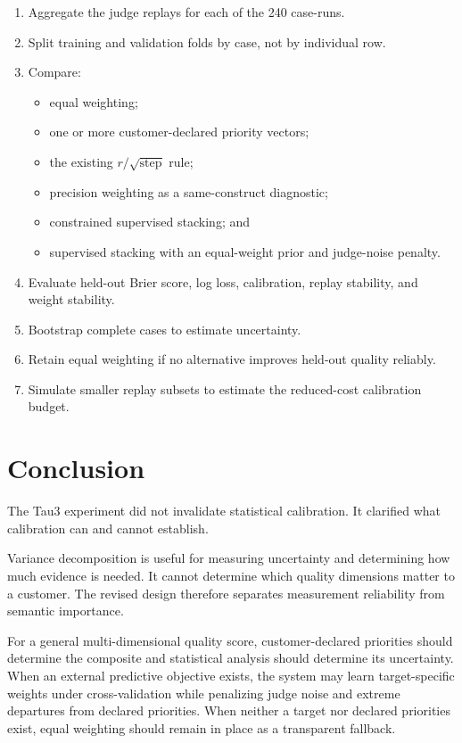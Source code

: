 \documentclass[11pt]{article}
\begin{document}
\begin{enumerate}
    \item Aggregate the judge replays for each of the 240 case-runs.
    \item Split training and validation folds by case, not by individual row.
    \item Compare:
    \begin{itemize}
        \item equal weighting;
        \item one or more customer-declared priority vectors;
        \item the existing \(r/\sqrt{\mathrm{step}}\) rule;
        \item precision weighting as a same-construct diagnostic;
        \item constrained supervised stacking; and
        \item supervised stacking with an equal-weight prior and judge-noise
        penalty.
    \end{itemize}
    \item Evaluate held-out Brier score, log loss, calibration, replay
    stability, and weight stability.
    \item Bootstrap complete cases to estimate uncertainty.
    \item Retain equal weighting if no alternative improves held-out quality
    reliably.
    \item Simulate smaller replay subsets to estimate the reduced-cost
    calibration budget.
\end{enumerate}

\section{Conclusion}

The Tau3 experiment did not invalidate statistical calibration. It clarified
what calibration can and cannot establish.

Variance decomposition is useful for measuring uncertainty and determining
how much evidence is needed. It cannot determine which quality dimensions
matter to a customer. The revised design therefore separates measurement
reliability from semantic importance.

For a general multi-dimensional quality score, customer-declared priorities
should determine the composite and statistical analysis should determine its
uncertainty. When an external predictive objective exists, the system may
learn target-specific weights under cross-validation while penalizing judge
noise and extreme departures from declared priorities. When neither a target
nor declared priorities exist, equal weighting should remain in place as a
transparent fallback.
\end{document}
